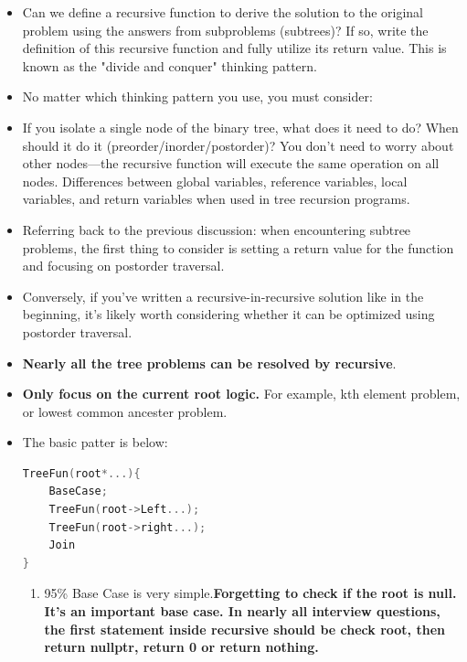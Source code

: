 \documentclass[a4paper,11pt,twoside]{book}
\begin{document}
\begin{itemize}
\item Can we define a recursive function to derive the solution to the original problem using the answers from subproblems (subtrees)? If so, write the definition of this recursive function and fully utilize its return value. This is known as the "divide and conquer" thinking pattern.

\item No matter which thinking pattern you use, you must consider:

\item If you isolate a single node of the binary tree, what does it need to do? When should it do it (preorder/inorder/postorder)? You don’t need to worry about other nodes—the recursive function will execute the same operation on all nodes.
Differences between global variables, reference variables, local variables, and return variables when used in tree recursion programs.

\item Referring back to the previous discussion: when encountering subtree problems, the first thing to consider is setting a return value for the function and focusing on postorder traversal.

\item Conversely, if you’ve written a recursive-in-recursive solution like in the beginning, it’s likely worth considering whether it can be optimized using postorder traversal.

\item \textbf{Nearly all the tree problems can be resolved by recursive}.

\item \textbf{Only focus on the current root logic.} For example, kth element problem, or lowest common ancester problem.

\item The basic patter is below: 
\begin{lstlisting}[frame=single, language=c++]
TreeFun(root*...){
	BaseCase;
	TreeFun(root->Left...);
	TreeFun(root->right...);
	Join
}
\end{lstlisting}

\begin{enumerate}
	
\item 95\% Base Case is very simple.\textbf{Forgetting to check if the root is null. It's an important base case. In nearly all interview questions, the first statement inside recursive should be check root, then return nullptr, return 0 or return nothing.}
	

\end{enumerate}
\end{itemize}
\end{document}
